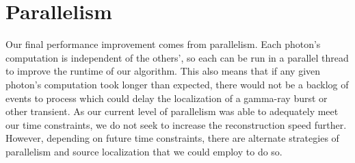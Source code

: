 \section{Parallelism}
Our final performance improvement comes from parallelism. Each photon's computation is independent of the others', so each can be run in a parallel thread to improve the runtime of our algorithm. This also means that if any given photon's computation took longer than expected, there would not be a backlog of events to process which could delay the localization of a gamma-ray burst or other transient. As our current level of parallelism was able to adequately meet our time constraints, we do not seek to increase the reconstruction speed further. However, depending on future time constraints, there are alternate strategies of parallelism and source localization that we could employ to do so.